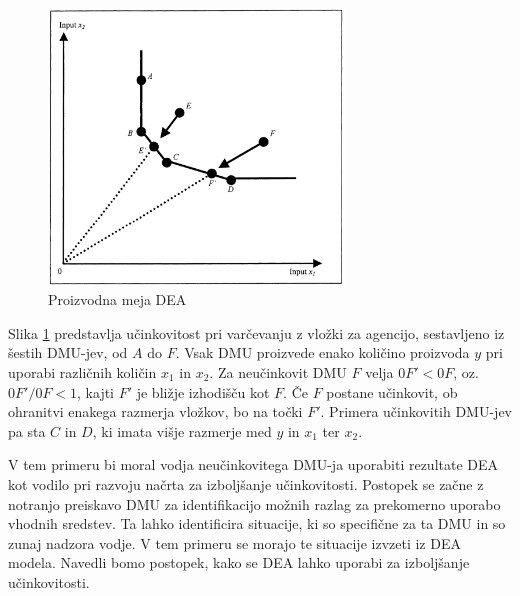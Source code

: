 \documentclass[12pt,a4paper]{article}
\theoremstyle{definition}
\begin{document}
\begin{figure}[htbp]
    \centering
    \includegraphics[width=0.7\textwidth]{dea_frontier.png}
    \caption{Proizvodna meja DEA}
    \label{fig:dea_frontier}
\end{figure}

Slika \ref{fig:dea_frontier} predstavlja učinkovitost pri 
varčevanju z vložki za agencijo, sestavljeno iz šestih
DMU-jev, od $A$ do $F$. Vsak DMU proizvede enako količino
proizvoda $y$ pri uporabi različnih količin $x_1$ in $x_2$.
Za neučinkovit DMU $F$ velja $0F' < 0F$, oz.\ $0F'/0F < 1$,
kajti $F'$ je bližje izhodišču kot $F$. Če $F$ postane 
učinkovit, ob ohranitvi enakega razmerja vložkov, bo
na točki $F'$. Primera učinkovitih DMU-jev pa sta $C$
in $D$, ki imata višje razmerje med $y$ in $x_1$ ter
$x_2$.

V tem primeru bi moral vodja neučinkovitega DMU-ja uporabiti
rezultate DEA kot vodilo pri razvoju načrta za izboljšanje
učinkovitosti. Postopek se začne z notranjo preiskavo DMU
za identifikacijo možnih razlag za prekomerno uporabo vhodnih sredstev.
Ta lahko identificira situacije, ki so specifične za ta DMU
in so zunaj nadzora vodje. V tem primeru se morajo te situacije
izvzeti iz DEA modela. Navedli bomo postopek, kako se DEA
lahko uporabi za izboljšanje učinkovitosti. \cite{Yaisawarng2002}
\end{document}
